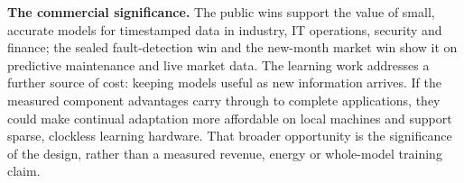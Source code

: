 \documentclass[10pt, a4 paper]{article}
\begin{document}
\begin{callout}
\textbf{The commercial significance.} The public wins support the value of small,
accurate models for timestamped data in industry, IT operations, security and
finance; the sealed fault-detection win and the new-month market win show it on
predictive maintenance and live market data. The learning work addresses a further source of cost: keeping models
useful as new information arrives. If the measured component advantages carry
through to complete applications, they could make continual adaptation more
affordable on local machines and support sparse, clockless learning hardware.
That broader opportunity is the significance of the design, rather than a
measured revenue, energy or whole-model training claim.
\end{callout}
\end{document}
